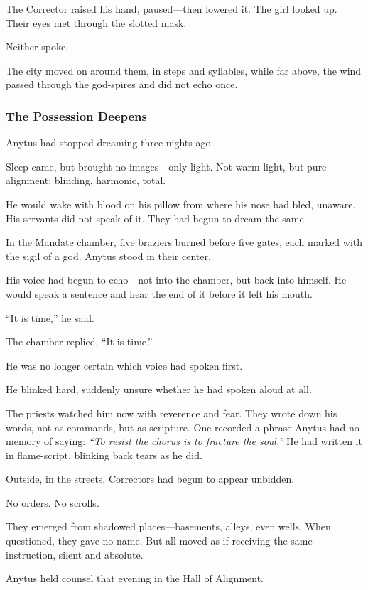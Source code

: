 \documentclass[12pt]{article}
\begin{document}
The Corrector raised his hand, paused—then lowered it. The girl looked up. Their eyes met through the slotted mask.

Neither spoke.

The city moved on around them, in steps and syllables, while far above, the wind passed through the god-spires and did not echo once.

\dotfill

\subsubsection*{The Possession Deepens}

Anytus had stopped dreaming three nights ago.

Sleep came, but brought no images—only light. Not warm light, but pure alignment: blinding, harmonic, total. 

He would wake with blood on his pillow from where his nose had bled, unaware. His servants did not speak of it. They had begun to dream the same.

In the Mandate chamber, five braziers burned before five gates, each marked with the sigil of a god. Anytus stood in their center. 

His voice had begun to echo—not into the chamber, but back into himself. He would speak a sentence and hear the end of it before it left his mouth.

“It is time,” he said.

The chamber replied, “It is time.”

He was no longer certain which voice had spoken first.

He blinked hard, suddenly unsure whether he had spoken aloud at all.

The priests watched him now with reverence and fear. They wrote down his words, not as commands, but as scripture. One recorded a phrase Anytus had no memory of saying: \textit{“To resist the chorus is to fracture the soul.”} He had written it in flame-script, blinking back tears as he did.

Outside, in the streets, Correctors had begun to appear unbidden.

No orders. 
No scrolls. 

They emerged from shadowed places—basements, alleys, even wells. When questioned, they gave no name. But all moved as if receiving the same instruction, silent and absolute.

Anytus held counsel that evening in the Hall of Alignment. 
\end{document}
